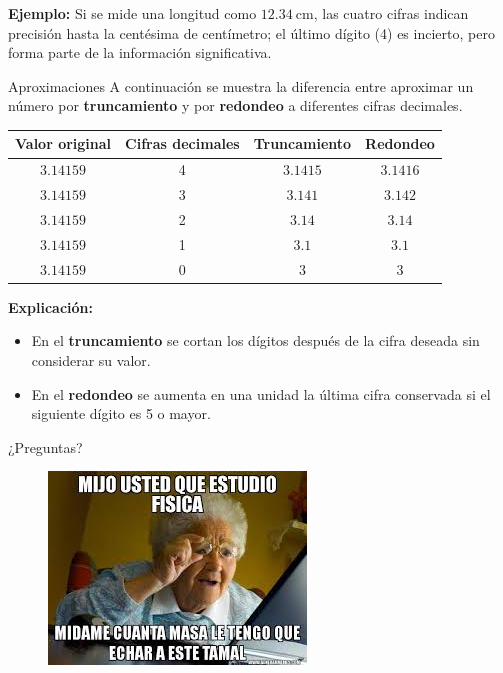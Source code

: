 \begin{frame}
    \textbf{Ejemplo:} Si se mide una longitud como $12.34 \ \text{cm}$, las cuatro 
cifras indican precisión hasta la centésima de centímetro; el último dígito (4) 
es incierto, pero forma parte de la información significativa.
\end{frame}

\begin{frame}{Aproximaciones}
    A continuación se muestra la diferencia entre aproximar un número 
por \textbf{truncamiento} y por \textbf{redondeo} a diferentes cifras decimales.

\begin{center}
\begin{tabular}{cccc}
\toprule
\textbf{Valor original} & \textbf{Cifras decimales} & \textbf{Truncamiento} & \textbf{Redondeo} \\
\midrule
$3.14159$ & 4 & $3.1415$ & $3.1416$ \\
$3.14159$ & 3 & $3.141$  & $3.142$  \\
$3.14159$ & 2 & $3.14$   & $3.14$   \\
$3.14159$ & 1 & $3.1$    & $3.1$    \\
$3.14159$ & 0 & $3$      & $3$      \\
\bottomrule
\end{tabular}
\end{center}

\textbf{Explicación:}
\begin{itemize}
    \item En el \textbf{truncamiento} se cortan los dígitos después de la cifra deseada sin considerar su valor.
    \item En el \textbf{redondeo} se aumenta en una unidad la última cifra conservada si el siguiente dígito es 5 o mayor.
\end{itemize}
\end{frame}

\begin{frame}
\begin{center}
    \Huge ¿Preguntas?
\end{center}
\end{frame}

\begin{frame}
    \begin{figure}
        \centering
        \includegraphics[width=0.8\linewidth]{figures/meme-1.jpeg}
    \end{figure}
\end{frame}

